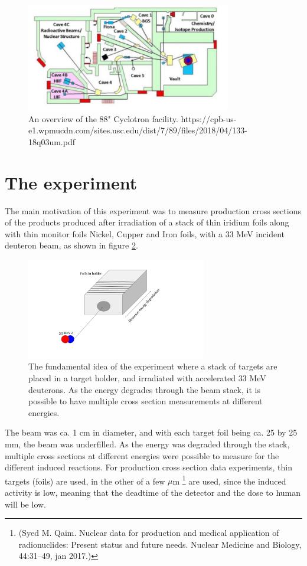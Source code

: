 \documentclass[a4paper,11pt,twoside]{book}
\begin{document}
\begin{figure}
    \centering
    \includegraphics[width=0.8\textwidth]{Experiment/LBL_88.png}
    \caption{An overview of the 88" Cyclotron facility. https://cpb-us-e1.wpmucdn.com/sites.usc.edu/dist/7/89/files/2018/04/133-18q03um.pdf }
    \label{fig:LBNL_88}
\end{figure}

\section{The experiment}
The main motivation of this experiment was to measure production cross sections of the products produced after irradiation of a stack of thin iridium foils along with thin monitor foils Nickel, Cupper and Iron foils, with a 33 MeV incident deuteron beam, as shown in figure \ref{fig:experiment_illustration}. 
\begin{figure}
    \centering
    \includegraphics[width=0.7\textwidth]{Experiment/Illustration_beamOnTarget.png}
    \caption{The fundamental idea of the experiment where a stack of targets are placed in a target holder, and irradiated with accelerated 33 MeV deuterons. As the energy degrades through the beam stack, it is possible to have multiple cross section measurements at different energies.}
    \label{fig:experiment_illustration}
\end{figure}

The beam was ca. 1 cm in diameter, and with each target foil being ca. 25 by 25 mm, the beam was underfilled. As the energy was degraded through the stack, multiple cross sections at different energies were possible to measure for the different induced reactions. For production cross section data experiments, thin targets (foils) are used, in the other of a few $\mu$m \footnote{(Syed M. Qaim. Nuclear data for production and medical application of radionuclides:
Present status and future needs. Nuclear Medicine and Biology, 44:31–49, jan 2017.)} are used, since the induced activity is low, meaning that the deadtime of the detector and the dose to human will be low.  
\end{document}

